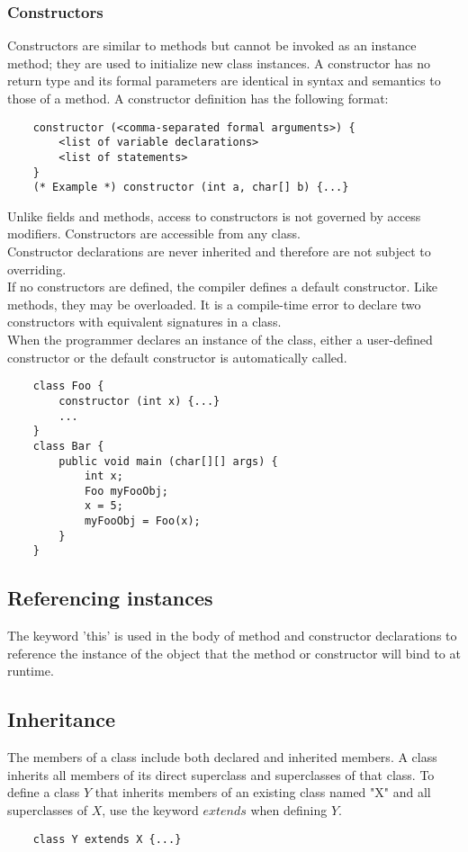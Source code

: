 \begin{homeworkProblem}
	\subsubsection{Constructors}
	Constructors are similar to methods but cannot be invoked as an instance method; they are used to initialize new class instances. A constructor has no return type and its formal parameters are identical in syntax and semantics to those of a method. A constructor definition has the following format:
	\begin{verbatim}
	constructor (<comma-separated formal arguments>) {
		<list of variable declarations>
		<list of statements>
	}
	(* Example *) constructor (int a, char[] b) {...}
	\end{verbatim}

	Unlike fields and methods, access to constructors is not governed by access modifiers. Constructors are accessible from any class.\\
	
	Constructor declarations are never inherited and therefore are not subject to overriding.\\
	
	If no constructors are defined, the compiler defines a default constructor. Like methods, they may be overloaded. It is a compile-time error to declare two constructors with equivalent signatures in a class.\\
	
	When the programmer declares an instance of the class, either a user-defined constructor or the default constructor is automatically called.
	\begin{verbatim}
	class Foo {
		constructor (int x) {...}
		...
	}
	class Bar {
		public void main (char[][] args) {
			int x; 
			Foo myFooObj;
			x = 5;
			myFooObj = Foo(x);
		}
	}
	\end{verbatim}
	
	\subsection{Referencing instances}
	The keyword 'this' is used in the body of method and constructor declarations to reference the instance of the object that the method or constructor will bind to at runtime.
	
	\subsection{Inheritance}
	The members of a class include both declared and inherited members. A class inherits all members of its direct superclass and superclasses of that class. To define a class $Y$ that inherits members of an existing class named "X" and all superclasses of $X$, use the keyword $extends$ when defining $Y$.
	\begin{verbatim}
	class Y extends X {...}
	\end{verbatim}	

\end{homeworkProblem}
